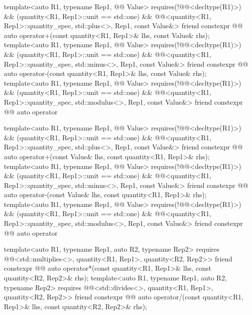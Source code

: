 \begin{codeblock}
{{  template<auto R1, typename Rep1, @@ Value>
    requires(!@@<decltype(R1)>) && (quantity<R1, Rep1>::unit == std::one) &&
            @@<quantity<R1, Rep1>::quantity_spec, std::plus<>, Rep1, const Value&>
  friend constexpr @@ auto operator+(const quantity<R1, Rep1>& lhs, const Value& rhs);
  template<auto R1, typename Rep1, @@ Value>
    requires(!@@<decltype(R1)>) && (quantity<R1, Rep1>::unit == std::one) &&
            @@<quantity<R1, Rep1>::quantity_spec, std::minus<>, Rep1, const Value&>
  friend constexpr @@ auto operator-(const quantity<R1, Rep1>& lhs, const Value& rhs);
  template<auto R1, typename Rep1, @@ Value>
    requires(!@@<decltype(R1)>) && (quantity<R1, Rep1>::unit == std::one) &&
            @@<quantity<R1, Rep1>::quantity_spec, std::modulus<>, Rep1, const Value&>
  friend constexpr @@ auto operator%

  template<auto R1, typename Rep1, @@ Value>
    requires(!@@<decltype(R1)>) && (quantity<R1, Rep1>::unit == std::one) &&
            @@<quantity<R1, Rep1>::quantity_spec, std::plus<>, Rep1, const Value&>
  friend constexpr @@ auto operator+(const Value& lhs, const quantity<R1, Rep1>& rhs);
  template<auto R1, typename Rep1, @@ Value>
    requires(!@@<decltype(R1)>) && (quantity<R1, Rep1>::unit == std::one) &&
            @@<quantity<R1, Rep1>::quantity_spec, std::minus<>, Rep1, const Value&>
  friend constexpr @@ auto operator-(const Value& lhs, const quantity<R1, Rep1>& rhs);
  template<auto R1, typename Rep1, @@ Value>
    requires(!@@<decltype(R1)>) && (quantity<R1, Rep1>::unit == std::one) &&
            @@<quantity<R1, Rep1>::quantity_spec, std::modulus<>, Rep1, const Value&>
  friend constexpr @@ auto operator%

  template<auto R1, typename Rep1, auto R2, typename Rep2>
    requires @@<std::multiplies<>, quantity<R1, Rep1>, quantity<R2, Rep2>>
  friend constexpr @@ auto operator*(const quantity<R1, Rep1>& lhs,
                                                 const quantity<R2, Rep2>& rhs);
  template<auto R1, typename Rep1, auto R2, typename Rep2>
    requires @@<std::divides<>, quantity<R1, Rep1>, quantity<R2, Rep2>>
  friend constexpr @@ auto operator/(const quantity<R1, Rep1>& lhs,
                                                 const quantity<R2, Rep2>& rhs);

}}
\end{codeblock}
